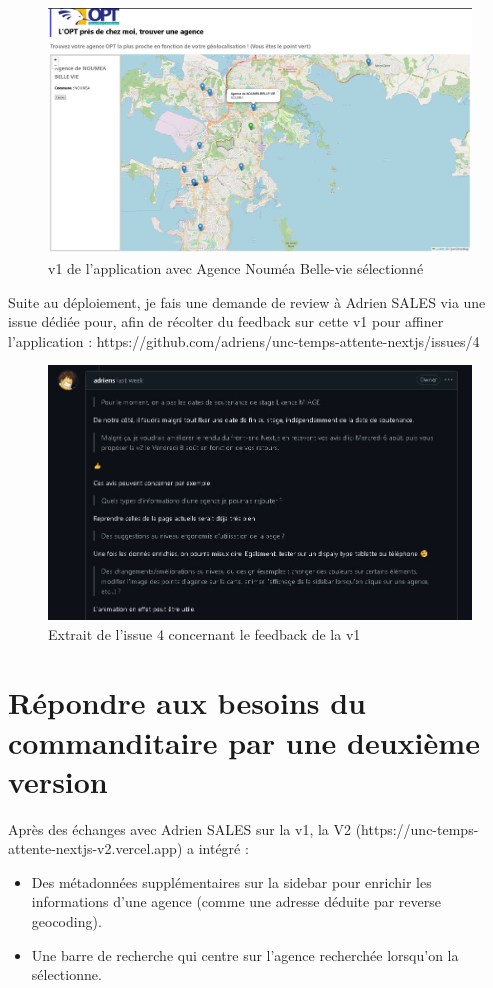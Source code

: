 \documentclass[12pt,a4paper]{report}
\begin{document}
\begin{figure}[h] %
    \centering
    \includegraphics[width=1\textwidth]{ressources_rapport/app_opt_v1.JPG}
    \caption{v1 de l'application avec Agence Nouméa Belle-vie sélectionné}
\end{figure}
\vspace{1cm}
Suite au déploiement, je fais une demande de review  à Adrien SALES via une issue dédiée pour, afin de récolter du feedback sur cette v1 pour affiner l'application : https://github.com/adriens/unc-temps-attente-nextjs/issues/4

\begin{figure}[h] %
    \centering
    \includegraphics[width=1\textwidth]{ressources_rapport/extrait_issue_4.JPG}
    \caption{Extrait de l'issue 4 concernant le feedback de la v1}
\end{figure}
\newpage

\section{Répondre aux besoins du commanditaire par une deuxième version}
Après des échanges avec Adrien SALES sur la v1, la V2 (https://unc-temps-attente-nextjs-v2.vercel.app) a intégré :
\begin{itemize}
    \item Des métadonnées supplémentaires sur la sidebar pour enrichir les informations d'une agence (comme une adresse déduite par reverse geocoding).
    \item Une barre de recherche qui centre sur l'agence recherchée lorsqu'on la sélectionne.
\end{itemize}
\end{document}
